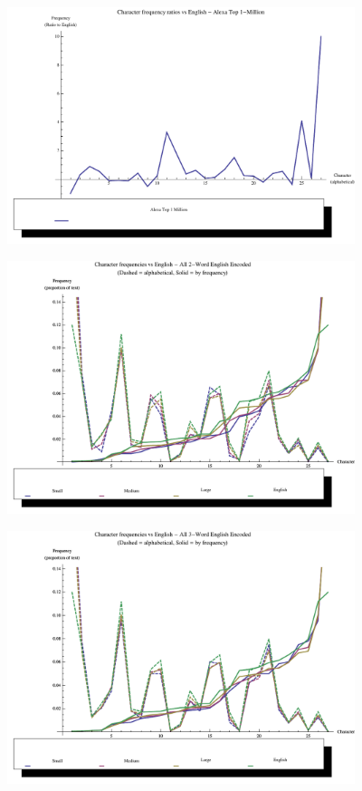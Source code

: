 \documentclass[12pt]{report}
\theoremstyle{remark}
\theoremstyle{definition}
\theoremstyle{definition}
\theoremstyle{definition}
\begin{document}
\begin{figure}
\centering
\includegraphics[width=4in]{figures/alexa_v_english-r.pdf}
\end{figure}
\begin{figure}
\centering
\includegraphics[width=4in]{figures/markov2-a.pdf}
\end{figure}
\begin{figure}
\centering
\includegraphics[width=4in]{figures/markov3-a.pdf}
\end{figure}
\end{document}
